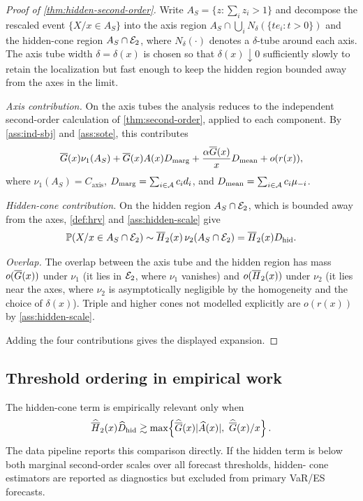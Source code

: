 \begin{proof}[Proof of \cref{thm:hidden-second-order}]
Write \(A_S=\{z:\sum_i z_i>1\}\) and decompose the rescaled event
\(\{X/x\in A_S\}\) into the axis region
\(A_S\cap\bigcup_i N_\delta(\{te_i:t>0\})\) and the hidden-cone region
\(A_S\cap\mathcal{E}_2\), where \(N_\delta(\cdot)\) denotes a \(\delta\)-tube around
each axis. The axis tube width \(\delta=\delta(x)\) is chosen so that
\(\delta(x)\downarrow 0\) sufficiently slowly to retain the localization but
fast enough to keep the hidden region bounded away from the axes in the limit.

\emph{Axis contribution.} On the axis tubes the analysis reduces to the
independent second-order calculation of \cref{thm:second-order}, applied to
each component. By \cref{ass:ind-sbj} and \cref{ass:sote}, this contributes
\[
  \overline{G}(x)\nu_1(A_S)+\overline{G}(x)A(x)D_{\mathrm{marg}}
  +\frac{\alpha\overline{G}(x)}{x}D_{\mathrm{mean}}+o(r(x)),
\]
where \(\nu_1(A_S)=C_{\mathrm{axis}}\), \(D_{\mathrm{marg}}=\sum_{i\in\mathcal{A}}c_id_i\),
and \(D_{\mathrm{mean}}=\sum_{i\in\mathcal{A}}c_i\mu_{-i}\).

\emph{Hidden-cone contribution.} On the hidden region
\(A_S\cap\mathcal{E}_2\), which is bounded away from the axes, \cref{def:hrv} and
\cref{ass:hidden-scale} give
\[
  \mathbb{P}(X/x\in A_S\cap\mathcal{E}_2)
  \sim \overline{H}_2(x)\,\nu_2(A_S\cap\mathcal{E}_2)
  = \overline{H}_2(x) D_{\mathrm{hid}}.
\]

\emph{Overlap.} The overlap between the axis tube and the hidden region has
mass \(o(\overline{G}(x))\) under \(\nu_1\) (it lies in $\mathcal{E}_2$, where $\nu_1$ vanishes)
and \(o(\overline{H}_2(x))\) under \(\nu_2\) (it lies near the axes, where $\nu_2$ is
asymptotically negligible by the homogeneity and the choice of $\delta(x)$).
Triple and higher cones not modelled explicitly are \(o(r(x))\) by
\cref{ass:hidden-scale}.

Adding the four contributions gives the displayed expansion.
\end{proof}

\subsection{Threshold ordering in empirical work}

The hidden-cone term is empirically relevant only when
\[
  \widehat\Hb_2(x)\widehat D_{\mathrm{hid}}
  \gtrsim
  \max\!\left\{\widehat\Gb(x)|\widehat A(x)|,\ \widehat\Gb(x)/x\right\}.
\]
The data pipeline reports this comparison directly. If the hidden term is
below both marginal second-order scales over all forecast thresholds, hidden-
cone estimators are reported as diagnostics but excluded from primary VaR/ES
forecasts.
